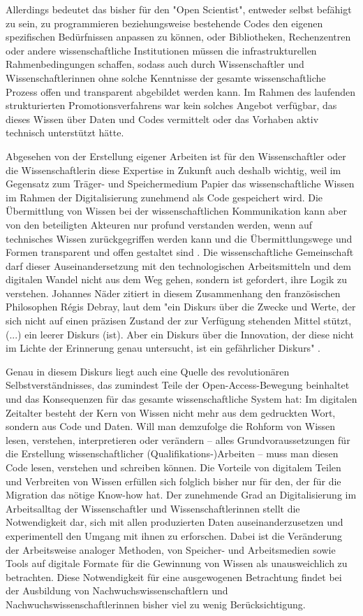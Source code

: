 Allerdings bedeutet das bisher für den "Open Scientist", entweder selbst befähigt zu sein, zu programmieren beziehungsweise bestehende Codes den eigenen spezifischen Bedürfnissen anpassen zu können, oder Bibliotheken, Rechenzentren oder andere wissenschaftliche Institutionen müssen die infrastrukturellen Rahmenbedingungen schaffen, sodass auch durch Wissenschaftler und Wissenschaftlerinnen ohne solche Kenntnisse der gesamte wissenschaftliche Prozess offen und transparent abgebildet werden kann. Im Rahmen des laufenden strukturierten Promotionsverfahrens war kein solches Angebot verfügbar, das dieses Wissen über Daten und Codes vermittelt oder das Vorhaben aktiv technisch unterstützt hätte.

Abgesehen von der Erstellung eigener Arbeiten ist für den Wissenschaftler oder die Wissenschaftlerin diese Expertise in Zukunft auch deshalb wichtig, weil im Gegensatz zum Träger- und Speichermedium Papier das wissenschaftliche Wissen im Rahmen der Digitalisierung zunehmend als Code gespeichert wird. Die Übermittlung von Wissen bei der wissenschaftlichen Kommunikation kann aber von den beteiligten Akteuren nur profund verstanden werden, wenn auf technisches Wissen zurückgegriffen werden kann und die Übermittlungswege und Formen transparent und offen gestaltet sind \cite{Davis_2011}. Die wissenschaftliche Gemeinschaft darf dieser Auseinandersetzung mit den technologischen Arbeitsmitteln und dem digitalen Wandel nicht aus dem Weg gehen, sondern ist gefordert, ihre Logik zu verstehen. Johannes Näder zitiert in diesem Zusammenhang den französischen Philosophen Régis Debray, laut dem "ein Diskurs über die Zwecke und Werte, der sich nicht auf einen präzisen Zustand der zur Verfügung stehenden Mittel stützt, (...) ein leerer Diskurs (ist). Aber ein Diskurs über die Innovation, der diese nicht im Lichte der Erinnerung genau untersucht, ist ein gefährlicher Diskurs" \cite[:117]{Naeder_2010} \cite[:246]{Debray_2003}.

Genau in diesem Diskurs liegt auch eine Quelle des revolutionären Selbstverständnisses, das zumindest Teile der Open-Access-Bewegung beinhaltet und das Konsequenzen für das gesamte wissenschaftliche System hat: Im digitalen Zeitalter besteht der Kern von Wissen nicht mehr aus dem gedruckten Wort, sondern aus Code und Daten. Will man demzufolge die Rohform von Wissen lesen, verstehen, interpretieren oder verändern – alles Grundvoraussetzungen für die Erstellung wissenschaftlicher (Qualifikations-)Arbeiten – muss man diesen Code lesen, verstehen und schreiben können. Die Vorteile von digitalem Teilen und Verbreiten von Wissen erfüllen sich folglich bisher nur für den, der für die Migration das nötige Know-how hat. Der zunehmende Grad an Digitalisierung im Arbeitsalltag der Wissenschaftler und Wissenschaftlerinnen stellt die Notwendigkeit dar, sich mit allen produzierten Daten auseinanderzusetzen und experimentell den Umgang mit ihnen zu erforschen. Dabei ist die Veränderung der Arbeitsweise analoger Methoden, von Speicher- und Arbeitsmedien sowie Tools auf digitale Formate für die Gewinnung von Wissen als unausweichlich zu betrachten. Diese Notwendigkeit für eine ausgewogenen Betrachtung findet bei der Ausbildung von Nachwuchswissenschaftlern und Nachwuchswissenschaftlerinnen bisher viel zu wenig Berücksichtigung.

